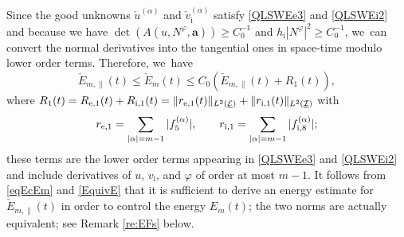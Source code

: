 \documentclass[JEP,XML,SOM,Unicode,NoFloatCountersInSection,published]{cedram}
\newcommand{\cI}{{\mathcal I}}
\newcommand{\cE}{{\mathcal E}}
\newcommand{\ul}[1]{\underline{#1}}
\theoremstyle{definition}
\begin{document}
Since the good unknowns $\check{u}^{(\alpha)}$ and $\check{v}_\mathrm{i}^{(\alpha)}$ satisfy \eqref{QLSWEe3} and \eqref{QLSWEi2} and because we have
$\det(A(u,N^\varphi,\bm{a})) \geq C_0^{-1}$ and $h_\mathrm{i}|N^\varphi|^2 \geq C_0^{-1}$, we~can convert the normal derivatives into the tangential ones in space-time modulo lower order terms.
Therefore, we~have
\begin{equation}\label{EquivE}
\check{E}_{m,\parallel}(t) \leq \check{E}_m(t) \leq C_0(\check{E}_{m,\parallel}(t) + R_1(t)),
\end{equation}
where $R_1(t)=R_{{\rm e},1}(t)+R_{{\rm i},1}(t)=\|r_{{\rm e},1}(t)\|_{L^2(\ul{\cE})}+\|r_{{\rm i},1}(t)\|_{L^2(\ul{\cI})}$ with
\[
r_{{\rm e},1} = \sum_{|\alpha|=m-1} |f_5^{(\alpha)}|, \qquad
r_{{\rm i},1} = \sum_{|\alpha|=m-1} |f_{{\rm i},8}^{(\alpha)}|;
\]
these terms are the lower order terms appearing in \eqref{QLSWEe3} and \eqref{QLSWEi2}
and include derivatives of $u$, $v_\mathrm{i}$, and $\varphi$ of order at most $m-1$.
It follows from \eqref{eqEcEm} and \eqref{EquivE} that it is sufficient to derive an energy estimate for $\check{E}_{m,\parallel}(t)$
in order to control the energy $E_m(t)$; the two norms are actually equivalent; see Remark \ref{re:EFs} below.
\end{document}
